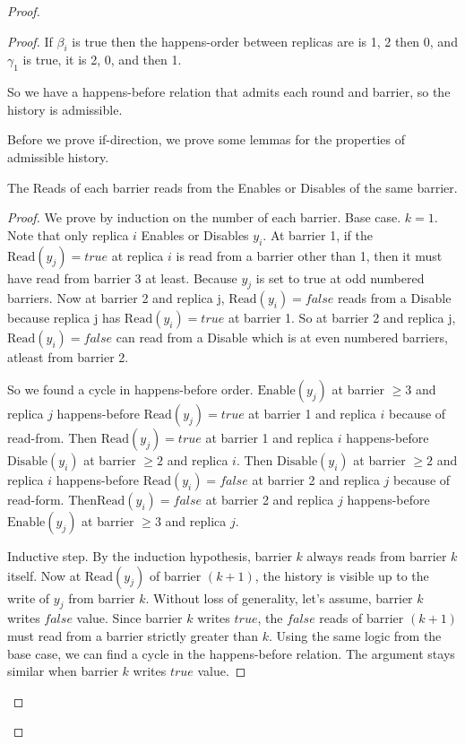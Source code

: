 \begin{proof}
\begin{proof}
    If $\beta_i$ is true then the happens-order between replicas are is 1, 2 then 0, and $\gamma_1$ is true, it is 2, 0, and then 1.

    So we have a happens-before relation that admits each round and barrier, so the history is admissible.

    Before we prove if-direction, we prove some lemmas for the properties of admissible history.

  \begin{lemma}
    \label{crdt:flag:npc-proof:lemma1}
    The \textrm{Read}s of each barrier reads from the \textrm{Enable}s or \textrm{Disable}s of the same barrier. 
  \end{lemma}

  \begin{proof}
    We prove by induction on the number of each barrier.
    Base case. $k = 1$. Note that only replica $i$ \textrm{Enable}s or \textrm{Disable}s $y_i$. At barrier 1, if the $\mathrm{Read}(y_j) = true$ at replica $i$ is read from a barrier other than 1, then it must have read from barrier 3 at least. Because $y_j$ is set to true at odd numbered barriers. Now at barrier 2 and replica j, $\mathrm{Read}(y_i) = false$ reads from a \textrm{Disable} because replica j has $\mathrm{Read}(y_i) = true$ at barrier 1. So at barrier 2 and replica j, $\mathrm{Read}(y_i) = false$ can read from a \textrm{Disable} which is at even numbered barriers, atleast from barrier 2.
    
    So we found a cycle in happens-before order. $\mathrm{Enable}(y_j)$ at barrier $\geq3$ and replica $j$ happens-before $\mathrm{Read}(y_j) = true$ at barrier 1 and replica $i$ because of read-from. Then $\mathrm{Read}(y_j) = true$ at barrier 1 and replica $i$ happens-before $\mathrm{Disable}(y_i)$ at barrier $\geq2$ and replica $i$. Then $\mathrm{Disable}(y_i)$ at barrier $\geq2$ and replica $i$ happens-before $\mathrm{Read}(y_i) = false$ at barrier 2 and replica $j$ because of read-form. Then$\mathrm{Read}(y_i) = false$ at barrier 2 and replica $j$ happens-before $\mathrm{Enable}(y_j)$ at barrier $\geq3$ and replica $j$.
    
    Inductive step. By the induction hypothesis, barrier $k$ always reads from barrier $k$ itself. Now at $\mathrm{Read}(y_j)$ of barrier $(k+1)$, the history is visible up to the write of $y_j$ from barrier $k$. Without loss of generality, let's assume, barrier $k$ writes $false$ value. Since barrier $k$ writes $true$, the $false$ reads of barrier $(k+1)$ must read from a barrier strictly greater than $k$. Using the same logic from the base case, we can find a cycle in the happens-before relation. The argument stays similar when barrier $k$ writes $true$ value.
  \end{proof}


\end{proof}
\end{proof}
